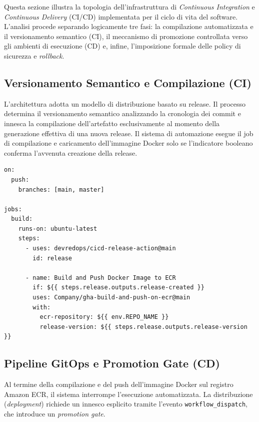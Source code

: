 Questa sezione illustra la topologia dell'infrastruttura di \emph{Continuous Integration} e \emph{Continuous Delivery} (CI/CD) implementata per il ciclo di vita del software. L'analisi procede separando logicamente tre fasi: la compilazione automatizzata e il versionamento semantico (CI), il meccanismo di promozione controllata verso gli ambienti di esecuzione (CD) e, infine, l'imposizione formale delle policy di sicurezza e \emph{rollback}.

\subsection{Versionamento Semantico e Compilazione (CI)}

L'architettura adotta un modello di distribuzione basato su release. Il processo determina il versionamento semantico analizzando la cronologia dei commit e innesca la compilazione dell'artefatto esclusivamente al momento della generazione effettiva di una nuova release. Il sistema di automazione esegue il job di compilazione e caricamento dell'immagine Docker solo se l'indicatore booleano conferma l'avvenuta creazione della release.

\begin{lstlisting}[caption={Definizione del job GitHub Actions di compilazione condizionato alla creazione della release}, label={lst:gha-release-build}]
on:
  push:
    branches: [main, master]

jobs:
  build:
    runs-on: ubuntu-latest
    steps:
      - uses: devredops/cicd-release-action@main
        id: release

      - name: Build and Push Docker Image to ECR
        if: ${{ steps.release.outputs.release-created }}
        uses: Company/gha-build-and-push-on-ecr@main
        with:
          ecr-repository: ${{ env.REPO_NAME }}
          release-version: ${{ steps.release.outputs.release-version }}
\end{lstlisting}

\subsection{Pipeline GitOps e Promotion Gate (CD)}

Al termine della compilazione e del push dell'immagine Docker sul registro Amazon ECR, il sistema interrompe l'esecuzione automatizzata. La distribuzione (\emph{deployment}) richiede un innesco esplicito tramite l'evento \texttt{workflow\_dispatch}, che introduce un \emph{promotion gate}.

